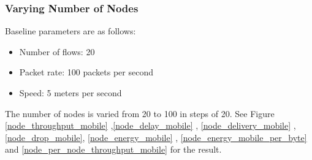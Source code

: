 \subsubsection{Varying Number of Nodes}
Baseline parameters are as follows:
\begin{itemize}
    \item Number of flows: 20
    \item Packet rate: 100 packets per second
    \item Speed: 5 meters per second
\end{itemize}
The number of nodes is varied from 20 to 100 in steps of 20.
See Figure \ref{node_throughput_mobile} ,\ref{node_delay_mobile} , \ref{node_delivery_mobile} , \ref{node_drop_mobile}, \ref{node_energy_mobile} , \ref{node_energy_mobile_per_byte} and \ref{node_per_node_throughput_mobile} for the result.

